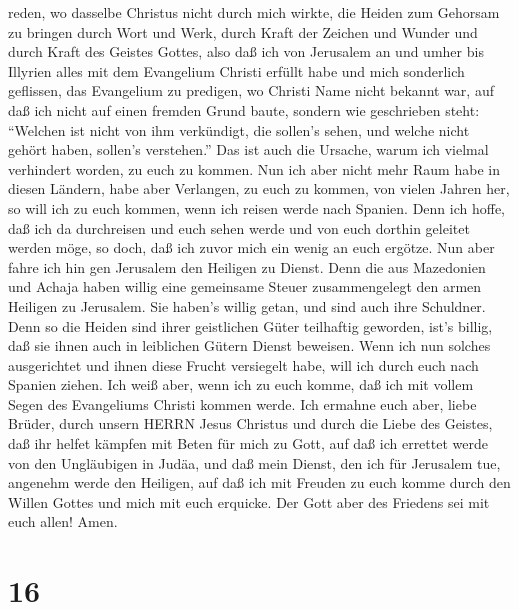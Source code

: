 reden, wo dasselbe Christus nicht durch mich wirkte, die Heiden zum
Gehorsam zu bringen durch Wort und Werk,  durch Kraft der
Zeichen und Wunder und durch Kraft des Geistes Gottes, also daß ich von
Jerusalem an und umher bis Illyrien alles mit dem Evangelium Christi
erfüllt habe  und mich sonderlich geflissen, das Evangelium
zu predigen, wo Christi Name nicht bekannt war, auf daß ich nicht auf
einen fremden Grund baute,  sondern wie geschrieben steht:
``Welchen ist nicht von ihm verkündigt, die sollen's sehen, und welche
nicht gehört haben, sollen's verstehen.''  Das ist auch die
Ursache, warum ich vielmal verhindert worden, zu euch zu kommen.
 Nun ich aber nicht mehr Raum habe in diesen Ländern, habe
aber Verlangen, zu euch zu kommen, von vielen Jahren her, 
so will ich zu euch kommen, wenn ich reisen werde nach Spanien. Denn ich
hoffe, daß ich da durchreisen und euch sehen werde und von euch dorthin
geleitet werden möge, so doch, daß ich zuvor mich ein wenig an euch
ergötze.  Nun aber fahre ich hin gen Jerusalem den Heiligen
zu Dienst.  Denn die aus Mazedonien und Achaja haben willig
eine gemeinsame Steuer zusammengelegt den armen Heiligen zu Jerusalem.
 Sie haben's willig getan, und sind auch ihre Schuldner.
Denn so die Heiden sind ihrer geistlichen Güter teilhaftig geworden,
ist's billig, daß sie ihnen auch in leiblichen Gütern Dienst beweisen.
 Wenn ich nun solches ausgerichtet und ihnen diese Frucht
versiegelt habe, will ich durch euch nach Spanien ziehen. 
Ich weiß aber, wenn ich zu euch komme, daß ich mit vollem Segen des
Evangeliums Christi kommen werde.  Ich ermahne euch aber,
liebe Brüder, durch unsern HERRN Jesus Christus und durch die Liebe des
Geistes, daß ihr helfet kämpfen mit Beten für mich zu Gott,
 auf daß ich errettet werde von den Ungläubigen in Judäa,
und daß mein Dienst, den ich für Jerusalem tue, angenehm werde den
Heiligen,  auf daß ich mit Freuden zu euch komme durch den
Willen Gottes und mich mit euch erquicke.  Der Gott aber
des Friedens sei mit euch allen! Amen.

\hypertarget{section-15}{%
\section{16}\label{section-15}}

